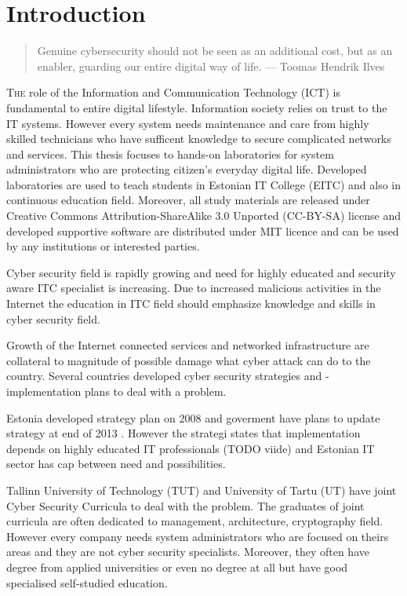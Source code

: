 \chapter{Introduction}
\label{Introduction}

 
\begin{quote}
Genuine cybersecurity should not be seen as an additional cost, but as an enabler, guarding our entire digital way of life. --- Toomas Hendrik Ilves
\end{quote}

\lettrine[lraise=0.1, nindent=0em, slope=-.5em]{\color{Violet}T}{he} role of the Information and Communication Technology (\gls{ICT}) is fundamental to entire digital lifestyle. Information society relies on trust to the IT systems. However every system needs maintenance and care from highly skilled technicians who have sufficent knowledge to secure complicated networks and services. This thesis focuses to hands-on laboratories for system administrators who are protecting citizen’s everyday digital life. Developed laboratories are used to teach students in Estonian IT College (\gls{EITC}) and also in continuous education field. Moreover, all study materials are released under Creative Commons Attribution-ShareAlike 3.0 Unported  (\gls{CC-BY-SA}) license and developed supportive software are distributed under \gls{MIT} licence and can be used by any institutions or interested parties.

Cyber security field is rapidly growing and need for highly educated and security aware ITC specialist is increasing. Due to increased malicious activities in the Internet the education in ITC field should emphasize knowledge and skills in cyber security field.

Growth of the Internet connected services and networked infrastructure are collateral to magnitude of possible damage what cyber attack can do to the country. Several countries developed cyber security strategies and -implementation plans to deal with a problem.

Estonia developed strategy plan on 2008 \citep{Strategy2008} and goverment have plans to update strategy at end of 2013 \citep{StrategyProposal2013}. However the strategi states that implementation depends on highly educated IT professionals {\color{red}(TODO viide)} and Estonian IT sector has cap between need and possibilities.

Tallinn University of Technology (\gls{TUT}) and University of Tartu (\gls{UT}) have joint Cyber Security Curricula to deal with the problem. The graduates of joint curricula are often dedicated to management, architecture, cryptography field.  However every company needs system administrators who are focused on theirs areas and they are not cyber security specialists. Moreover, they often have degree from applied universities or even no degree at all but have good specialised self-studied education.

